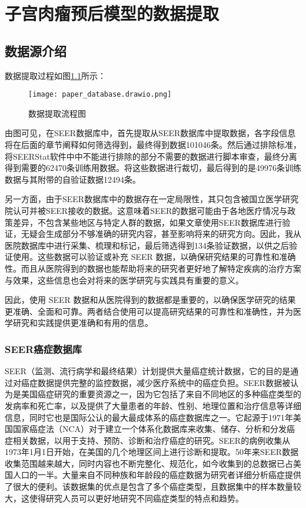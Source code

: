 \chapter{子宫肉瘤预后模型的数据提取}
\label{cha:data}

\section{数据源介绍}

数据提取过程如图\ref{fig:dataset1}所示：

\begin{figure}[!htbp]
    \centering
    \texttt{[image: paper\_database.drawio.png]}
    \caption{数据提取流程图} \label{fig:dataset1}
\end{figure}

由图可见，在SEER数据库中，首先提取从SEER数据库中提取数据，各字段信息将在后面的章节阐释如何筛选得到，最终得到数据101046条。然后通过排除标准，将SEERStat软件中中不能进行排除的部分不需要的数据进行脚本审查，最终分离得到需要的62470条训练用数据。将这些数据进行裁切，最后得到的是49976条训练数据与其附带的自验证数据12494条。

另一方面，由于SEER数据库中的数据存在一定局限性，其只包含被国立医学研究院认可并被SEER接收的数据。这意味着SEER的数据可能由于各地医疗情况与政策差异，不包含某些地区与特定人群的数据，如果文章使用SEER数据库进行验证，无疑会生成部分不够准确的研究内容，甚至影响将来的研究方向。因此，我从医院数据库中进行采集、梳理和标记，最后筛选得到134条验证数据，以供之后验证使用。这些数据可以验证或补充 SEER 数据，以确保研究结果的可靠性和准确性。而且从医院得到的数据也能帮助将来的研究者更好地了解特定疾病的治疗方案与效果，这些信息也会对将来的医学研究与实践具有重要的意义。

因此，使用 SEER 数据和从医院得到的数据都是重要的，以确保医学研究的结果更准确、全面和可靠。两者结合使用可以提高研究结果的可靠性和准确性，并为医学研究和实践提供更准确和有用的信息。

\subsection{SEER癌症数据库}

SEER（监测、流行病学和最终结果）计划提供大量癌症统计数据，它的目的是通过对癌症数据提供完整的监控数据，减少医疗系统中的癌症负担。SEER数据被认为是美国癌症研究的重要资源之一，因为它包括了来自不同地区的多种癌症类型的发病率和死亡率，以及提供了大量患者的年龄、性别、地理位置和治疗信息等详细信息，同时它也是国际公认的最大最成体系的癌症数据库之一。它起源于1971年美国国家癌症法（NCA）对于建立一个体系化数据库来收集、储存、分析和分发癌症相关数据，以用于支持、预防、诊断和治疗癌症的研究。SEER的病例收集从1973年1月1日开始，在美国的几个地理区间上进行诊断和提取。50年来SEER数据收集范围越来越大，同时内容也不断完整化、规范化，如今收集到的总数据已占美国人口的一半。大量来自不同种族和年龄段的癌症数据为研究者详细分析癌症提供了很大的便利。该数据集的优点是包含了多个癌症类型，且数据集中的样本数量较大，这使得研究人员可以更好地研究不同癌症类型的特点和趋势。

